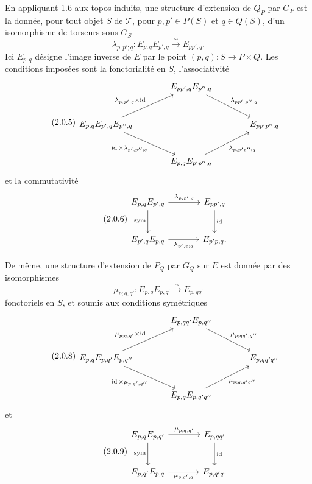 \documentclass[11pt]{article}
\providecommand{\id}{\operatorname{id}}
\providecommand{\sym}{\mathrm{sym}}
\providecommand{\id}{\mathrm{id}}
\begin{document}
En appliquant 1.6 aux topos induits, une structure d'extension de \(Q_P\) par \(G_P\) est la donnée, pour tout objet \(S\) de \(\mathcal T\), pour \(p,p'\in P(S)\) et \(q\in Q(S)\), d'un isomorphisme de torseurs sous \(G_S\)
\begin{equation}\tag{2.0.4}
  \lambda_{p,p';q}:E_{p,q}E_{p',q}\xrightarrow{\sim}E_{pp',q}.
\end{equation}
Ici \(E_{p,q}\) désigne l'image inverse de \(E\) par le point \((p,q):S\to P\times Q\).  Les conditions imposées sont la fonctorialité en \(S\), l'associativité
\begin{equation}\tag{2.0.5}
\begin{tikzcd}[column sep=large,row sep=large]
& E_{pp',q}E_{p'',q}\arrow[dr,"\lambda_{pp',p'';q}"]&\\
E_{p,q}E_{p',q}E_{p'',q}
\arrow[ur,"\lambda_{p,p';q}\times\id"]
\arrow[dr,"\id\times\lambda_{p',p'';q}"']&&E_{pp'p'',q}\\
& E_{p,q}E_{p'p'',q}\arrow[ur,"\lambda_{p,p'p'';q}"']&
\end{tikzcd}
\end{equation}
et la commutativité
\begin{equation}\tag{2.0.6}
\begin{tikzcd}[column sep=large,row sep=large]
E_{p,q}E_{p',q}\arrow[r,"\lambda_{p,p';q}"]\arrow[d,"\sym"']&E_{pp',q}\arrow[d,"\id"]\\
E_{p',q}E_{p,q}\arrow[r,"\lambda_{p',p;q}"']&E_{p'p,q}.
\end{tikzcd}
\end{equation}

De même, une structure d'extension de \(P_Q\) par \(G_Q\) sur \(E\) est donnée par des isomorphismes
\begin{equation}\tag{2.0.7}
  \mu_{p;q,q'}:E_{p,q}E_{p,q'}\xrightarrow{\sim}E_{p,qq'}
\end{equation}
fonctoriels en \(S\), et soumis aux conditions symétriques
\begin{equation}\tag{2.0.8}
\begin{tikzcd}[column sep=large,row sep=large]
& E_{p,qq'}E_{p,q''}\arrow[dr,"\mu_{p;qq',q''}"]&\\
E_{p,q}E_{p,q'}E_{p,q''}
\arrow[ur,"\mu_{p;q,q'}\times\id"]
\arrow[dr,"\id\times\mu_{p;q',q''}"']&&E_{p,qq'q''}\\
& E_{p,q}E_{p,q'q''}\arrow[ur,"\mu_{p;q,q'q''}"']&
\end{tikzcd}
\end{equation}
et
\begin{equation}\tag{2.0.9}
\begin{tikzcd}[column sep=large,row sep=large]
E_{p,q}E_{p,q'}\arrow[r,"\mu_{p;q,q'}"]\arrow[d,"\sym"']&E_{p,qq'}\arrow[d,"\id"]\\
E_{p,q'}E_{p,q}\arrow[r,"\mu_{p;q',q}"']&E_{p,q'q}.
\end{tikzcd}
\end{equation}
\end{document}
